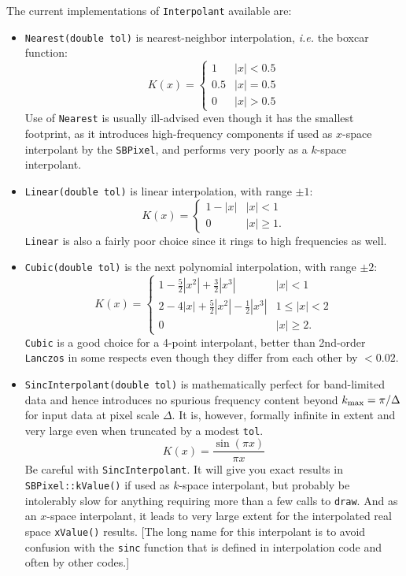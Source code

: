 \documentclass[11pt,preprint,flushrt]{aastex}
\begin{document}
The current implementations of {\tt Interpolant} available are:
\begin{itemize}
\item {\tt Nearest(double tol)} is nearest-neighbor interpolation, {\it i.e.} the boxcar function:
\begin{equation}
K(x) = \left\{ \begin{array}{cl}
1 & |x| < 0.5 \\
0.5 & |x| = 0.5 \\
0 & |x| > 0.5
\end{array}
\right.
\end{equation}
Use of {\tt Nearest} is usually ill-advised even though it has the smallest footprint, as it introduces high-frequency components if used as $x$-space interpolant by the {\tt SBPixel}, and performs very poorly as a $k$-space interpolant. 

\item {\tt Linear(double tol)} is linear interpolation, with range $\pm 1$:
\begin{equation}
K(x) = \left\{ \begin{array}{cl}
1-|x| & |x| < 1 \\
0 & |x| \ge 1.
\end{array}
\right.
\end{equation}
{\tt Linear} is also a fairly poor choice since it rings to high frequencies as well.

\item {\tt Cubic(double tol)} is the next polynomial interpolation, with range $\pm 2$:
\begin{equation}
K(x) = \left\{ \begin{array}{cl}
1-\frac{5}{2}|x^2| + \frac{3}{2}|x^3| & |x| < 1 \\
2-4|x|+\frac{5}{2}|x^2|-\frac{1}{2}|x^3| & 1 \le |x| < 2 \\
0 & |x| \ge 2.
\end{array}
\right.
\end{equation}
{\tt Cubic} is a good choice for a 4-point interpolant, better than 2nd-order {\tt Lanczos} in some respects even though they differ from each other by $<0.02$.

\item {\tt SincInterpolant(double tol)} is mathematically perfect for band-limited data and hence introduces no spurious frequency content beyond $k_{\rm max}=\pi/\Delta$ for input data at pixel scale $\Delta$.  It is, however, formally infinite in extent and very large even when truncated by a modest {\tt tol}.  
\begin{equation}
K(x) = \frac{\sin(\pi x)}{\pi x}
\end{equation}
Be careful with {\tt SincInterpolant}.  It will give you exact results in {\tt SBPixel::kValue()} if used as $k$-space interpolant, but probably be intolerably slow for anything requiring more than a few calls to {\tt draw}.  And as an $x$-space interpolant, it leads to very large extent for the interpolated real space {\tt xValue()} results.  [The long name for this interpolant is to avoid confusion with the {\tt sinc} function that is defined in interpolation code and often by other codes.]


\end{itemize}
\end{document}
